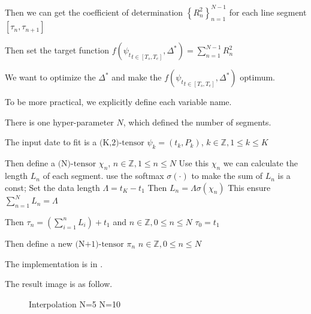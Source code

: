 \documentclass{article}
\theoremstyle{definition} %
\begin{document}
Then we can get the coefficient of determination
$\left\{R^2_n\right\}_{n=1}^{N-1}$
for each line segment
$\left[\tau_n,\tau_{n+1}\right]$

Then set the target function
$f({\psi_t}_{t\in\left[T_s,T_e\right]},
    \Delta^*)
    =\sum_{n=1}^{N-1}R^2_n$

We want to optimize the $\Delta^*$
and make the
$f({\psi_t}_{t\in\left[T_s,T_e\right]},
    \Delta^*)$
optimum.

To be more practical, we explicitly define
each variable name.

There is one hyper-parameter $N$, which
defined the number of segments.

The input date to fit is a
$\text{(K,2)-tensor}$
$\psi_k=\left(t_k,P_k\right)$,
$k\in\mathbb{Z},1\leq k\leq K$

Then define a $\text{(N)-tensor}$ $\chi_n$,
$n\in\mathbb{Z},1\leq n\leq N$
Use this $\chi_n$ we can calculate
the length $L_n$ of each segment.
use the softmax $\sigma(\cdot)$
to make the sum of $L_n$
is a const;
Set the data length $\Lambda=t_K-t_1$
Then $L_n=\Lambda\sigma(\chi_n)$
This ensure
$\sum_{n=1}^{N}L_n=\Lambda$

Then $\tau_n=(\sum_{i=1}^{n}L_i)+t_1$
and
$n\in\mathbb{Z},0\leq n\leq N$
$\tau_0=t_1$

Then define a new $\text{(N+1)-tensor}$
$\pi_n$
$n\in\mathbb{Z},0\leq n\leq N$

The implementation is in
\cite[computeGraph]{Data_process}.

The result image is as follow.
\begin{figure}[!ht]
    \centering
    \caption{Interpolation N=5 N=10}
\end{figure}
\end{document}
